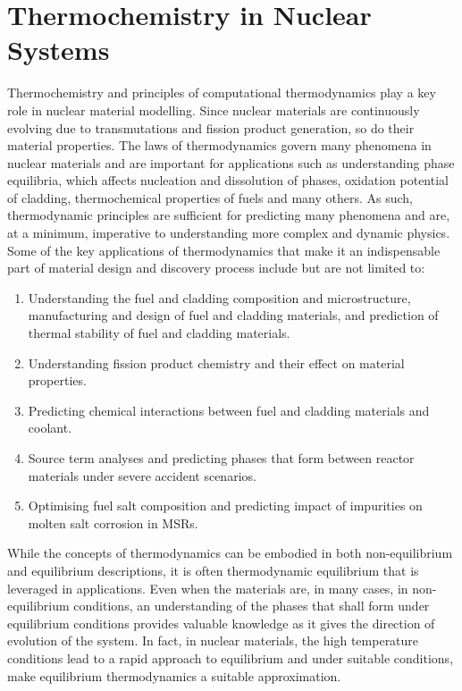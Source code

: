 \section{Thermochemistry in Nuclear Systems}
	Thermochemistry and principles of computational thermodynamics play a key role in nuclear material modelling. Since nuclear materials are continuously evolving due to transmutations and fission product generation, so do their material properties. The laws of thermodynamics govern many phenomena in nuclear materials and are important for applications such as understanding phase equilibria, which affects nucleation and dissolution of phases, oxidation potential of cladding, thermochemical properties of fuels and many others. As such, thermodynamic principles are sufficient for predicting many phenomena and are, at a minimum, imperative to understanding more complex and dynamic physics. Some of the key applications of thermodynamics that make it an indispensable part of material design and discovery process include but are not limited to:
	\begin{enumerate}
		\item Understanding the fuel and cladding composition and microstructure, manufacturing and design of fuel and cladding materials, and prediction of thermal stability of fuel and cladding materials.
		\item Understanding fission product chemistry and their effect on material properties.
		\item Predicting chemical interactions between fuel and cladding materials and coolant.
		\item Source term analyses and predicting phases that form between reactor materials under severe accident scenarios.
		\item Optimising fuel salt composition and predicting impact of impurities on molten salt corrosion in MSRs.
	\end{enumerate}
	
	While the concepts of thermodynamics can be embodied in both non-equilibrium and equilibrium descriptions, it is often thermodynamic equilibrium that is leveraged in applications. Even when the materials are, in many cases, in non-equilibrium conditions, an understanding of the phases that shall form under equilibrium conditions provides valuable knowledge as it gives the direction of evolution of the system.  In fact, in nuclear materials, the high temperature conditions lead to a rapid approach to equilibrium and under suitable conditions, make equilibrium thermodynamics a suitable approximation.
	
